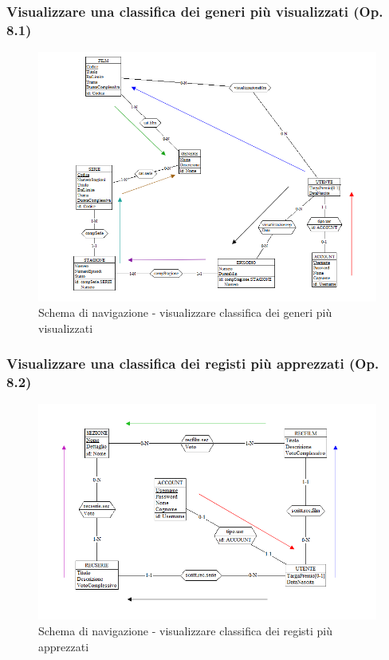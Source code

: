 \documentclass[a4paper,12pt]{report}
\begin{document}
	\subsubsection{Visualizzare una classifica dei generi più visualizzati (Op. 8.1)}
	\begin{figure}[H]
		\centering
		\includegraphics[width=450pt]{ER/navigazione/classificageneri.png}
		\caption{Schema di navigazione - visualizzare classifica dei generi più visualizzati}
	\end{figure}	
	
	\subsubsection{Visualizzare una classifica dei registi più apprezzati (Op. 8.2)}
	\begin{figure}[H]
		\centering
		\includegraphics[width=450pt]{ER/navigazione/classificaregisti.png}
		\caption{Schema di navigazione - visualizzare classifica dei registi più apprezzati}
	\end{figure}
	
\end{document}
